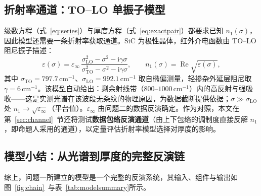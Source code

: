 \documentclass[11pt,a4paper,fontset=fandol]{ctexart}
\newcommand{\invcm}{\,\mathrm{cm^{-1}}}
\begin{document}
\subsection{折射率通道：TO--LO 单振子模型}

级数方程（式~\eqref{eq:series}）与厚度方程（式~\eqref{eq:exactpair}）都要求已知 $n_1(\sigma)$，因此模型还需要一条折射率获取通道。SiC 为极性晶体，红外介电函数由 TO--LO 阻尼振子描述\cite{spitzer1959,madan2024}：
\begin{equation}
    \varepsilon(\sigma) = \varepsilon_\infty\,
    \frac{\sigma_{\mathrm{LO}}^2-\sigma^2-\mathrm{i}\gamma\sigma}
         {\sigma_{\mathrm{TO}}^2-\sigma^2-\mathrm{i}\gamma\sigma},
    \qquad n_1(\sigma)=\operatorname{Re}\sqrt{\varepsilon(\sigma)},
    \label{eq:oscillator}
\end{equation}
其中 $\sigma_{\mathrm{TO}}=797.7\invcm$、$\sigma_{\mathrm{LO}}=992.1\invcm$ 取自椭偏测量\cite{madan2024}，轻掺杂外延层阻尼取 $\gamma=6\invcm$。该模型自动给出：剩余射线带（$800\text{--}1000\invcm$）内的高反射与强吸收——这是实测光谱在该波段无条纹的物理原因，为数据截断提供依据；$\sigma\gg\sigma_{\mathrm{LO}}$ 处 $n_1\to\sqrt{\varepsilon_\infty}$（平台值）。$\varepsilon_\infty$ 由问题二的数据反演确定。作为对照，本文在第~\ref{sec:channel}~节还将测试\textbf{数据包络反演通道}（由上下包络的调制度直接反解 $n_1$，即命题人采用的通道\cite{xue2026}），以定量评估折射率模型选择对厚度的影响。

\subsection{模型小结：从光谱到厚度的完整反演链}\label{sec:modelsummary}

综上，问题一所建立的模型是一个完整的反演系统，其输入、组件与输出如图~\ref{fig:chain}~与表~\ref{tab:modelsummary}所示。
\end{document}
